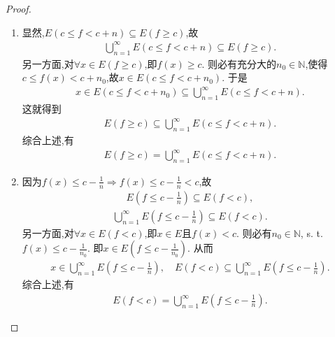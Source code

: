 \documentclass[../../main.tex]{subfiles}%
\begin{document}
\begin{proof}
\begin{enumerate}[(1)]
\item 显然,$E(c \leqslant f < c + n) \subseteq E(f \geqslant c)$,故
\begin{align*}
\bigcup_{n=1}^{\infty} E(c \leqslant f < c + n) \subseteq E(f \geqslant c).
\end{align*}
另一方面,对$\forall x \in E(f \geqslant c)$,即$f(x) \geqslant c$. 则必有充分大的$n_0 \in \mathbb{N}$,使得$c \leqslant f(x) < c + n_0$,故$x \in E(c \leqslant f < c + n_0)$. 于是
\begin{align*}
x \in E(c \leqslant f < c + n_0) \subseteq \bigcup_{n=1}^{\infty} E(c \leqslant f < c + n).
\end{align*}
这就得到
\begin{align*}
E(f \geqslant c) \subseteq \bigcup_{n=1}^{\infty} E(c \leqslant f < c + n).
\end{align*}
综合上述,有
\begin{align*}
E(f \geqslant c) = \bigcup_{n=1}^{\infty} E(c \leqslant f < c + n).
\end{align*}

\item 因为$f(x) \leqslant c - \frac{1}{n} \Rightarrow f(x) \leqslant c - \frac{1}{n} < c$,故
\begin{align*}
E\left(f \leqslant c - \frac{1}{n}\right) \subseteq E(f < c),
\end{align*}
\begin{align*}
\bigcup_{n=1}^{\infty} E\left(f \leqslant c - \frac{1}{n}\right) \subseteq E(f < c).
\end{align*}
另一方面,对$\forall x \in E(f < c)$,即$x \in E$且$f(x) < c$. 则必有$n_0 \in \mathbb{N}$, s. t. $f(x) \leqslant c - \frac{1}{n_0}$. 即$x \in E\left(f \leqslant c - \frac{1}{n_0}\right)$. 从而
\begin{align*}
x \in \bigcup_{n=1}^{\infty} E\left(f \leqslant c - \frac{1}{n}\right), \quad E(f < c) \subseteq \bigcup_{n=1}^{\infty} E\left(f \leqslant c - \frac{1}{n}\right).
\end{align*}
综合上述,有
\begin{align*}
E(f < c) = \bigcup_{n=1}^{\infty} E\left(f \leqslant c - \frac{1}{n}\right).
\end{align*}
\end{enumerate}

\end{proof}
\end{document}
